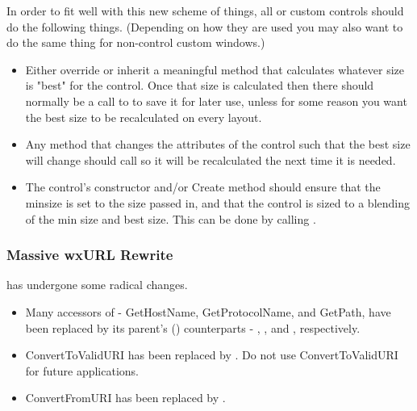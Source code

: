   In order to fit well with this new scheme of things, all 
  or custom controls should do the following things.  (Depending on
  how they are used you may also want to do the same thing for
  non-control custom windows.)

\begin{itemize}\itemsep=0pt
\item Either override or inherit a meaningful  method
      that calculates whatever size is "best" for the control.  Once
      that size is calculated then there should normally be a call to
       to save it for later use, unless for some reason
      you want the best size to be recalculated on every layout.

\item Any method that changes the attributes of the control such that
      the best size will change should call  so it
      will be recalculated the next time it is needed.

\item The control's constructor and/or Create method should ensure
      that the minsize is set to the size passed in, and that the
      control is sized to a blending of the min size and best size.
      This can be done by calling .
\end{itemize}



\subsubsection{Massive wxURL Rewrite}\label{wxurlrewrite}

 has undergone some radical changes.

\begin{itemize}\itemsep=0pt
\item Many accessors of  - GetHostName, GetProtocolName, and GetPath,
      have been replaced by its parent's () counterparts - ,
      , and , respectively.

\item ConvertToValidURI has been replaced by .  Do not use
      ConvertToValidURI for future applications.

\item ConvertFromURI has been replaced by .
\end{itemize}



